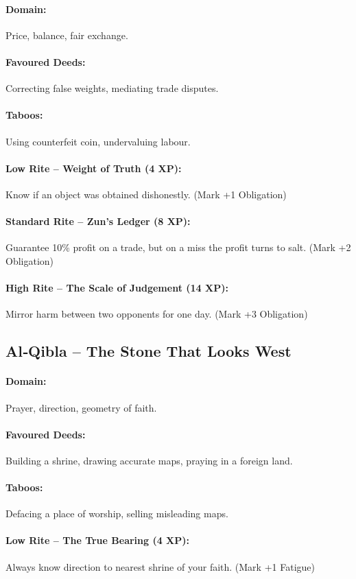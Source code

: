 \documentclass[11pt]{book}
\begin{document}
\paragraph{Domain:} Price, balance, fair exchange.
\paragraph{Favoured Deeds:} Correcting false weights, mediating trade disputes.
\paragraph{Taboos:} Using counterfeit coin, undervaluing labour.
\paragraph{Low Rite -- Weight of Truth (4 XP):} Know if an object was obtained dishonestly. (Mark +1 Obligation)
\paragraph{Standard Rite -- Zun’s Ledger (8 XP):} Guarantee 10\% profit on a trade, but on a miss the profit turns to salt. (Mark +2 Obligation)
\paragraph{High Rite -- The Scale of Judgement (14 XP):} Mirror harm between two opponents for one day. (Mark +3 Obligation)

\subsection{Al‑Qibla – The Stone That Looks West}
\paragraph{Domain:} Prayer, direction, geometry of faith.
\paragraph{Favoured Deeds:} Building a shrine, drawing accurate maps, praying in a foreign land.
\paragraph{Taboos:} Defacing a place of worship, selling misleading maps.
\paragraph{Low Rite -- The True Bearing (4 XP):} Always know direction to nearest shrine of your faith. (Mark +1 Fatigue)
\end{document}
